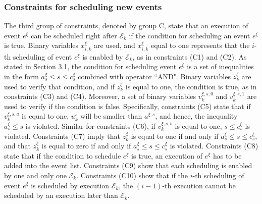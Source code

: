 \documentclass[]{interact}
\theoremstyle{plain}%
\theoremstyle{definition}
\theoremstyle{remark}
\begin{document}
\subsubsection{Constraints for scheduling new events}
The third group of constraints, denoted by group C, state that an execution of event $e^{\xi}$ can be scheduled right after $\mathcal{E}_k$ if the condition for scheduling an event $e^{\xi}$ is true. Binary variables $x^{\xi}_{i,k}$ are used, and $x^{\xi}_{i,k}$ equal to one represents that the $i$-th scheduling of event $e^{\xi}$ is enabled by $\mathcal{E}_k$, as in constraints (C1) and (C2). As stated in Section 3.1, the condition for scheduling event $e^{\xi}$ is a set of inequalities in the form $a^{\xi}_s\le s \le c^{\xi}_s$ combined with operator ``AND". Binary variables $z^{\xi}_{k}$ are used to verify that condition, and if $z^{\xi}_{k}$ is equal to one, the condition is true, as in constraints (C3) and (C4). Moreover, a set of binary variables $v^{\xi,s,0}_k$ and $v^{\xi,s,1}_k$ are used to verify if the condition is false. Specifically, constraints (C5) state that if  $v^{\xi,s,a}_k$ is equal to one, $u^s_k$ will be smaller than $a^{\xi,s}$, and hence, the inequality $a^{\xi}_s\le s$ is violated. Similar for constraints (C6), if $v^{\xi,s,b}_k$ is equal to one, $s \le c^{\xi}_s$ is violated. Constraints (C7) imply that $z^{\xi}_{k}$ is equal to one if and only if $a^{\xi}_s\le s \le c^{\xi}_s$, and that $z^{\xi}_{k}$ is equal to zero if and only if $a^{\xi}_s\le s \le c^{\xi}_s$ is violated. Constraints (C8) state that if the condition to schedule $e^{\xi}$ is true, an execution of $e^{\xi}$ has to be added into the event list. Constraints (C9) show that each scheduling is enabled by one and only one $\mathcal{E}_{k}$. Constraints (C10) show that if the $i$-th scheduling of event $e^{\xi}$ is scheduled by execution $\mathcal{E}_{k}$, the $(i-1)$-th execution cannot be scheduled by an execution later than $\mathcal{E}_{k}$. 
\end{document}
